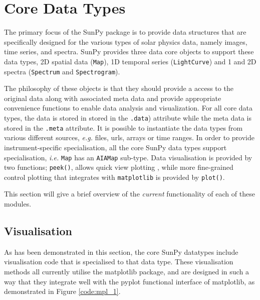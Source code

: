 \section{Core Data Types}
The primary focus of the SunPy package is to provide data structures 
that are specifically designed for the various types of solar physics data, namely
images, time series, and spectra. SunPy provides three data core
objects to support these data types, 2D spatial data 
(\texttt{Map}), 1D temporal series (\texttt{LightCurve}) and 1 and 2D spectra 
(\texttt{Spectrum} and \texttt{Spectrogram}).

The philosophy of these objects is that they should provide a access to the original data
along with associated meta data and provide appropriate convenience functions to
enable data analysis and visualization. For all core data types, the data is stored in 
stored in the \texttt{.data}) attribute while the meta data is stored 
in the \texttt{.meta} attribute. It is 
possible to instantiate the data types from various different 
sources, \textit{e.g.} files, urls, arrays or time ranges.  In order to provide
instrument-specific specialisation, all the core SunPy data types support specialisation, 
\textit{i.e.} \texttt{Map} has an \texttt{AIAMap} sub-type. 
Data visualisation is provided by two functions; \texttt{peek()}, allows quick view plotting
, while more fine-grained control plotting that integrates with 
\texttt{matplotlib} is provided by \texttt{plot()}.

This section will give a brief overview of the \textit{current} functionality 
of each of these modules.





\subsection{Visualisation}
\label{subsec:Viz}
As has been demonstrated in this section, the core SunPy datatypes 
include visualisation code that is specialised to that data type. 
These visualisation methods all currently utilise the matplotlib 
package, and are designed in such a way that they integrate well with 
the pyplot functional interface of matplotlib, as demonstrated in 
Figure \ref{code:mpl_1}.

